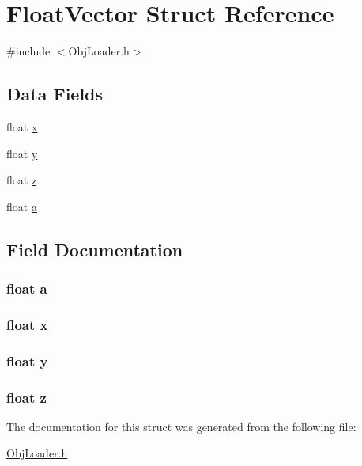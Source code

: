 \hypertarget{struct_float_vector}{\section{Float\-Vector Struct Reference}
\label{struct_float_vector}
}


{\ttfamily \#include $<$Obj\-Loader.\-h$>$}

\subsection*{Data Fields}
\begin{DoxyCompactItemize}
\item 
float \hyperlink{struct_float_vector_ad0da36b2558901e21e7a30f6c227a45e}{x}
\item 
float \hyperlink{struct_float_vector_aa4f0d3eebc3c443f9be81bf48561a217}{y}
\item 
float \hyperlink{struct_float_vector_af73583b1e980b0aa03f9884812e9fd4d}{z}
\item 
float \hyperlink{struct_float_vector_a4aec1a5be9d9a4a394a2e49e9744286e}{a}
\end{DoxyCompactItemize}


\subsection{Field Documentation}
\hypertarget{struct_float_vector_a4aec1a5be9d9a4a394a2e49e9744286e}{
\subsubsection[{a}]{\setlength{\rightskip}{0pt plus 5cm}float a}}\label{struct_float_vector_a4aec1a5be9d9a4a394a2e49e9744286e}
\hypertarget{struct_float_vector_ad0da36b2558901e21e7a30f6c227a45e}{
\subsubsection[{x}]{\setlength{\rightskip}{0pt plus 5cm}float x}}\label{struct_float_vector_ad0da36b2558901e21e7a30f6c227a45e}
\hypertarget{struct_float_vector_aa4f0d3eebc3c443f9be81bf48561a217}{
\subsubsection[{y}]{\setlength{\rightskip}{0pt plus 5cm}float y}}\label{struct_float_vector_aa4f0d3eebc3c443f9be81bf48561a217}
\hypertarget{struct_float_vector_af73583b1e980b0aa03f9884812e9fd4d}{
\subsubsection[{z}]{\setlength{\rightskip}{0pt plus 5cm}float z}}\label{struct_float_vector_af73583b1e980b0aa03f9884812e9fd4d}


The documentation for this struct was generated from the following file\-:\begin{DoxyCompactItemize}
\item 
\hyperlink{_obj_loader_8h}{Obj\-Loader.\-h}\end{DoxyCompactItemize}
